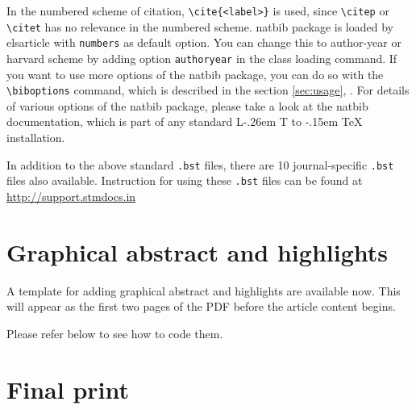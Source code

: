 \documentclass[a4paper,12pt]{article}
\makeatletter
\def\file#1{\textsf{#1}\xspace}
\DeclareRobustCommand{\LaTeX}{L\kern-.26em%
        {\sbox\z@ T%
         \vbox to\ht\z@{\hbox{\check@mathfonts
           \fontsize\sf@size\z@
           \math@fontsfalse\selectfont
          A\,}%
         \vss}%
        }%
     \kern-.15em%
    \TeX}
\makeatother
\begin{document}
In the numbered scheme of citation, \verb+\cite{<label>}+ is used,
since \verb+\citep+ or \verb+\citet+ has no relevance in the numbered
scheme.  \file{natbib} package is loaded by \file{elsarticle} with
\verb+numbers+ as default option.  You can change this to author-year
or harvard scheme by adding option \verb+authoryear+ in the class
loading command.  If you want to use more options of the \file{natbib}
package, you can do so with the \verb+\biboptions+ command, which is
described in the section \ref{sec:usage}, .  For
details of various options of the \file{natbib} package, please take a
look at the \file{natbib} documentation, which is part of any standard
\LaTeX{} installation.

In addition to the above standard \verb+.bst+ files, there are 10
journal-specific \verb+.bst+ files also available.
Instruction for using these \verb+.bst+ files can be found at 
\href{http://support.stmdocs.in/wiki/index.php?title=Model-wise_bibliographic_style_files}
{http://support.stmdocs.in}

\section{Graphical abstract and highlights}
A template for adding graphical abstract and highlights are available
now. This will appear as the first two pages of the PDF before the
article content begins.

\pagebreak
Please refer below to see how to code them.


\section{Final print}\label{sec:final}
\end{document}

